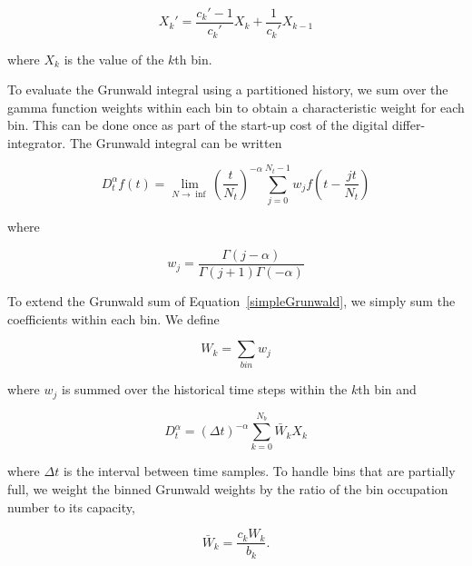 \begin{equation}
X_k\prime = \frac{c_k\prime-1}{c_k\prime}X_k + \frac{1}{c_k\prime}X_{k-1}
\label{avgShiftReg}
\end{equation}

\noindent where $X_k$ is the value of the $k$th bin.

To evaluate the Grunwald integral using a partitioned history, we sum over the gamma function weights within each bin to obtain a characteristic weight for each bin. This can be done once as part of the start-up cost of the digital differ-integrator.  The Grunwald integral can be written

\begin{equation}
D^\alpha_tf(t) = \displaystyle \lim_{N\rightarrow\inf} \left(\frac{t}{N_t}\right)^{-\alpha}
\displaystyle\sum\limits_{j=0}^{N_t-1} w_{j} f\left(t-\frac{j t}{N_t}\right)
\label{simpleGrunwald}
\end{equation}

\noindent where 

\begin{equation}
w_{j} = \frac{\Gamma(j-\alpha)}{\Gamma(j+1)\Gamma(-\alpha)}
\label{wj}
\end{equation}

To extend the Grunwald sum of Equation~\ref{simpleGrunwald}, we simply
sum the coefficients within each bin. We define

\begin{equation}
W_k = \displaystyle\sum\limits_{bin} w_j
\label{sumWk}
\end{equation}

\noindent where $w_j$ is summed over the historical time steps within the $k$th bin and

\begin{equation}
D^\alpha_t = \displaystyle(\Delta t)^{-\alpha}\sum\limits_{k=0}^{N_b}\bar{W}_kX_k
\label{avgSimpleGrunwald}
\end{equation}

\noindent where $\Delta t$ is the interval between time samples. To handle bins that are partially full, we weight the binned Grunwald weights by the ratio of the bin occupation number to its capacity, 

\begin{equation}
\bar{W}_k= \frac{c_k W_k}{b_k}.
\label{Wbar}
\end{equation} 







